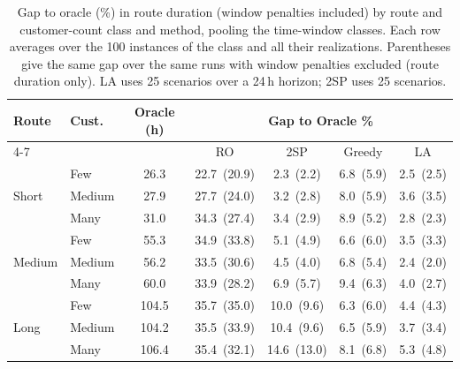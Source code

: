 \begin{table}[htbp]
\centering
\caption{Gap to oracle (\%) in route duration (window penalties included) by route and customer-count class and method, pooling the time-window classes.  Each row averages over the 100 instances of the class and all their realizations.  Parentheses give the same gap over the same runs with window penalties excluded (route duration only).  LA uses 25 scenarios over a 24\,h horizon; 2SP uses 25 scenarios.}
\label{tab:gap-simplified}
\begin{tabular}{ll c cccc}
\toprule
\multirow{2}{*}{\textbf{\small Route}} & \multirow{2}{*}{\textbf{\small Cust.}} & \multirow{2}{*}{\textbf{Oracle (h)}} &
\multicolumn{4}{c}{\textbf{Gap to Oracle \%}} \\
\cmidrule(lr){4-7}
 & & & RO & 2SP & Greedy & LA \\
\midrule
\multirow{3}{*}{\small Short} & {\small Few} & 26.3 & 22.7~{\scriptsize(20.9)} & 2.3~{\scriptsize(2.2)} & 6.8~{\scriptsize(5.9)} & 2.5~{\scriptsize(2.5)} \\
 & {\small Medium} & 27.9 & 27.7~{\scriptsize(24.0)} & 3.2~{\scriptsize(2.8)} & 8.0~{\scriptsize(5.9)} & 3.6~{\scriptsize(3.5)} \\
 & {\small Many} & 31.0 & 34.3~{\scriptsize(27.4)} & 3.4~{\scriptsize(2.9)} & 8.9~{\scriptsize(5.2)} & 2.8~{\scriptsize(2.3)} \\
\midrule
\multirow{3}{*}{\small Medium} & {\small Few} & 55.3 & 34.9~{\scriptsize(33.8)} & 5.1~{\scriptsize(4.9)} & 6.6~{\scriptsize(6.0)} & 3.5~{\scriptsize(3.3)} \\
 & {\small Medium} & 56.2 & 33.5~{\scriptsize(30.6)} & 4.5~{\scriptsize(4.0)} & 6.8~{\scriptsize(5.4)} & 2.4~{\scriptsize(2.0)} \\
 & {\small Many} & 60.0 & 33.9~{\scriptsize(28.2)} & 6.9~{\scriptsize(5.7)} & 9.4~{\scriptsize(6.3)} & 4.0~{\scriptsize(2.7)} \\
\midrule
\multirow{3}{*}{\small Long} & {\small Few} & 104.5 & 35.7~{\scriptsize(35.0)} & 10.0~{\scriptsize(9.6)} & 6.3~{\scriptsize(6.0)} & 4.4~{\scriptsize(4.3)} \\
 & {\small Medium} & 104.2 & 35.5~{\scriptsize(33.9)} & 10.4~{\scriptsize(9.6)} & 6.5~{\scriptsize(5.9)} & 3.7~{\scriptsize(3.4)} \\
 & {\small Many} & 106.4 & 35.4~{\scriptsize(32.1)} & 14.6~{\scriptsize(13.0)} & 8.1~{\scriptsize(6.8)} & 5.3~{\scriptsize(4.8)} \\
\bottomrule
\end{tabular}
\end{table}
